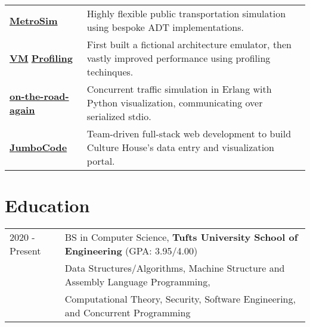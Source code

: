 \documentclass[letter,10pt]{article}
\begin{document}
\begin{tabularx}{\linewidth}{@{}l X@{}}
\href{}{\textbf{MetroSim}} & Highly flexible public transportation simulation using bespoke ADT implementations. \\[3.75pt]
\href{https://github.com/liam-strand/hw6-um}{\textbf{VM}} \href{https://github.com/liam-strand/hw7-profiling}{\textbf{Profiling}} & First built a fictional architecture emulator, then vastly improved performance using profiling techinques. \\[3.75pt]
\href{https://github.com/liam-strand/cs-21-final-project}{\textbf{on-the-road-again}} & Concurrent traffic simulation in Erlang with Python visualization, communicating over serialized stdio. \\[3.75pt]
\href{}{\textbf{JumboCode}} & Team-driven full-stack web development to build Culture House's data entry and visualization portal. \\[3.75pt]
\end{tabularx}

\section{Education}
\begin{tabularx}{\linewidth}{@{}l X@{}}	
2020 - Present & BS in Computer Science, \textbf{Tufts University School of Engineering} \hfill \normalsize (GPA: 3.95/4.00) \\
    & \footnotesize{Data Structures/Algorithms, Machine Structure and Assembly Language Programming,} \\
    & \footnotesize{Computational Theory, Security, Software Engineering, and Concurrent Programming}
\end{tabularx}



\vfill
{}
\end{document}
